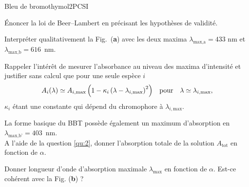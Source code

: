 \begin{exercise}{Bleu de bromothymol}{2}{PCSI}
\begin{questions}
\question Énoncer la loi de Beer--Lambert en précisant les hypothèses de validité.

\question Interpréter qualitativement la Fig.~(\textbf{a}) avec les deux maxima $\lambda_\text{max,a} = 433$ nm et {$\lambda_\text{max,b} = 616$~nm}.

\question\label{qu:2} Rappeler l'intérêt de mesurer l'absorbance au niveau des maxima d'intensité et justifier sans calcul que pour une seule espèce $i$
$$A_i(\lambda) \simeq A_{i,\text{max}}\,\qty(1 - \kappa_i\,\qty(\lambda - \lambda_{i,\text{max}})^2) \qqtext{pour} \lambda \simeq \lambda_{i,\text{max}},$$
$\kappa_i$ étant une constante qui dépend du chromophore à $\lambda_{i,\text{max}}$.



\question La forme basique du BBT possède également un maximum d'absorption en $\lambda_\text{max,b'} = 403$~nm. \\ A l'aide de la question \ref{qu:2}, donner l'absorption totale de la solution $A_\text{tot}$ en fonction de $\alpha$.

\question Donner longueur d'onde d'absorption maximale $\lambda_\text{max}$ en fonction de $\alpha$. Est-ce cohérent avec la Fig. (\textbf{b}) ?


\end{questions}
\end{exercise}

